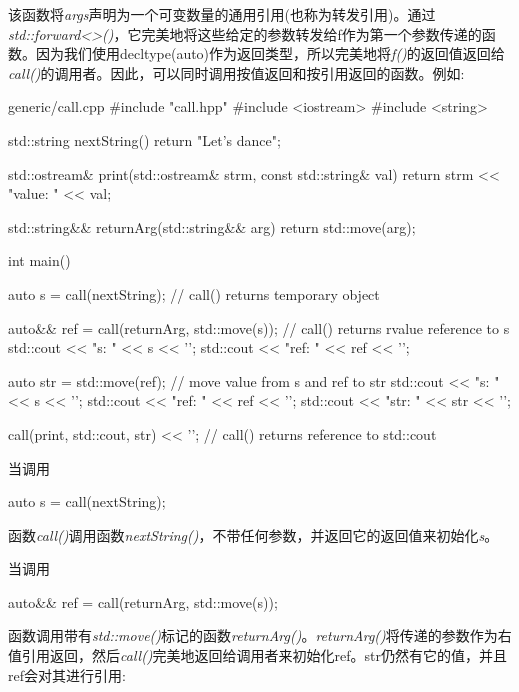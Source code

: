 该函数将\textit{args}声明为一个可变数量的通用引用(也称为转发引用)。通过\textit{std::\allowbreak{}forward<\allowbreak{}>(\allowbreak{})\allowbreak{}}，它完美地将这些给定的参数转发给f作为第一个参数传递的函数。因为我们使用decltype(auto)作为返回类型，所以完美地将\textit{f()}的返回值返回给\textit{call()}的调用者。因此，可以同时调用按值返回和按引用返回的函数。例如:\par

\begin{codeboxt}[cpp]{generic/call.cpp}
#include "call.hpp"
#include <iostream>
#include <string>

std::string nextString()
{
  return "Let's dance";
}

std::ostream& print(std::ostream& strm, const std::string& val)
{
  return strm << "value: " << val;
}

std::string&& returnArg(std::string&& arg)
{
  return std::move(arg);
}

int main()
{
  auto s = call(nextString); // call() returns temporary object

  auto&& ref = call(returnArg, std::move(s)); // call() returns rvalue reference to s
  std::cout << "s: " << s << '\n';
  std::cout << "ref: " << ref << '\n';

  auto str = std::move(ref); // move value from s and ref to str
  std::cout << "s: " << s << '\n';
  std::cout << "ref: " << ref << '\n';
  std::cout << "str: " << str << '\n';

  call(print, std::cout, str) << '\n'; // call() returns reference to std::cout
}
\end{codeboxt}

当调用\par

\begin{codebox}[cpp]
  auto s = call(nextString);
\end{codebox}

函数\textit{call()}调用函数\textit{nextString(\allowbreak{})\allowbreak{}}，不带任何参数，并返回它的返回值来初始化\textit{s}。\par

当调用\par

\begin{codebox}[cpp]
  auto&& ref = call(returnArg, std::move(s));
\end{codebox}

函数调用带有\textit{std::move()}标记的函数\textit{returnArg()}。\textit{returnArg()}将传递的参数作为右值引用返回，然后\textit{call()}完美地返回给调用者来初始化ref。str仍然有它的值，并且ref会对其进行引用:\par

